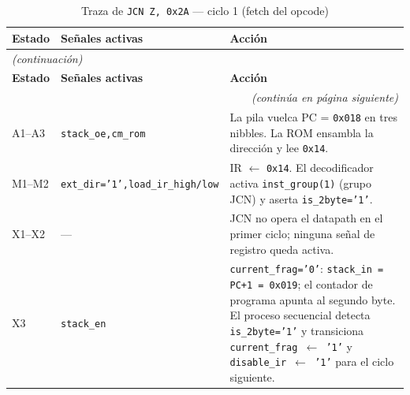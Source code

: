 \documentclass[%
    school=etsisi,%
    type=pfg,%
    degree=61CI,%
]{upm-report}
\begin{document}
\begin{longtable}{@{}p{1.2cm}p{4.2cm}p{\dimexpr\linewidth-5.4cm-4\tabcolsep\relax}@{}}
\caption{Traza de \texttt{JCN Z, 0x2A} --- ciclo 1 (fetch del opcode)}
\label{tab:traza-jcn-c1}\\
\toprule
\textbf{Estado} & \textbf{Señales activas} & \textbf{Acción}\\
\midrule
\endfirsthead
\multicolumn{3}{l}{\small\itshape(continuación)}\\
\toprule
\textbf{Estado} & \textbf{Señales activas} & \textbf{Acción}\\
\midrule
\endhead
\midrule
\multicolumn{3}{r}{\small\itshape(continúa en página siguiente)}\\
\endfoot
\bottomrule
\endlastfoot
A1--A3 & \texttt{stack\_oe,}\newline\texttt{cm\_rom} &
    La pila vuelca PC = \texttt{0x018} en tres nibbles.
    La ROM ensambla la dirección y lee \texttt{0x14}. \\
\addlinespace
M1--M2 & \texttt{ext\_dir='1',}\newline\texttt{load\_ir\_high/low} &
    IR $\leftarrow$ \texttt{0x14}.
    El decodificador activa \texttt{inst\_group(1)} (grupo JCN) y
    aserta \texttt{is\_2byte='1'}. \\
\addlinespace
X1--X2 & --- &
    JCN no opera el datapath en el primer ciclo; ninguna señal de
    registro queda activa. \\
\addlinespace
X3 & \texttt{stack\_en} &
    \texttt{current\_frag='0'}: \texttt{stack\_in = PC+1 = 0x019};
    el contador de programa apunta al segundo byte.
    El proceso secuencial detecta \texttt{is\_2byte='1'} y transiciona
    \texttt{current\_frag $\leftarrow$ '1'} y
    \texttt{disable\_ir $\leftarrow$ '1'} para el ciclo siguiente. \\
\end{longtable}
\end{document}
